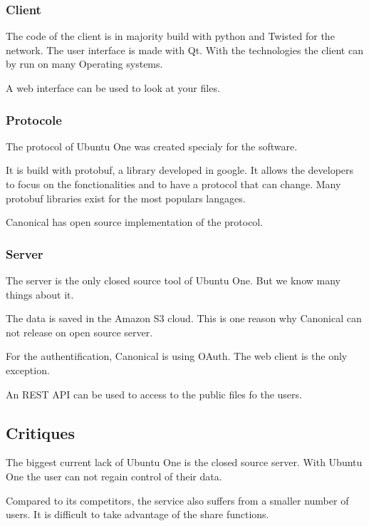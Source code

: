 \subsubsection{Client}
The code of the client is in majority build with python and Twisted for the network. The user interface is made with Qt. With the technologies the client can by run on many Operating systems.

A web interface can be used to look at your files.

\subsubsection{Protocole}

The protocol of Ubuntu One was created specialy for the software.

It is build with protobuf, a library developed in google. It allows the developers to focus on the fonctionalities and to have a protocol that can change. Many protobuf libraries exist for the most populars langages.

Canonical has open source implementation of the protocol.

\subsubsection{Server}

The server is the only closed source tool of Ubuntu One. But we know many things about it.

The data is saved in the Amazon S3 cloud. This is one reason why Canonical can not release on open source server.

For the authentification, Canonical is using OAuth. The web client is the only exception.

An REST API can be used to access to the public files fo the users.

\subsection{Critiques}

The biggest current lack of Ubuntu One is the closed source server. With Ubuntu One the user can not regain control of their data.

Compared to its competitors, the service also suffers from a smaller number of users. It is difficult to take advantage of the share functions.
